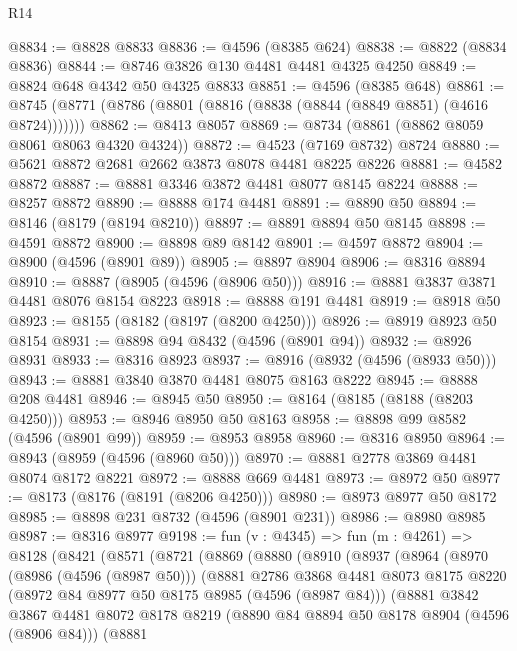 \begin{lexlean}{R14}
\begin{coremodule}
@8834 := @8828 @8833
@8836 := @4596 (@8385 @624)
@8838 := @8822 (@8834 @8836)
@8844 := @8746 @3826 @130 @4481 @4481 @4325 @4250
@8849 := @8824 @648 @4342 @50 @4325 @8833
@8851 := @4596 (@8385 @648)
@8861 := @8745 (@8771 (@8786 (@8801 (@8816 (@8838 (@8844 (@8849 @8851) (@4616 @8724)))))))
@8862 := @8413 @8057
@8869 := @8734 (@8861 (@8862 @8059 @8061 @8063 @4320 @4324))
@8872 := @4523 (@7169 @8732) @8724
@8880 := @5621 @8872 @2681 @2662 @3873 @8078 @4481 @8225 @8226
@8881 := @4582 @8872
@8887 := @8881 @3346 @3872 @4481 @8077 @8145 @8224
@8888 := @8257 @8872
@8890 := @8888 @174 @4481
@8891 := @8890 @50
@8894 := @8146 (@8179 (@8194 @8210))
@8897 := @8891 @8894 @50 @8145
@8898 := @4591 @8872
@8900 := @8898 @89 @8142
@8901 := @4597 @8872
@8904 := @8900 (@4596 (@8901 @89))
@8905 := @8897 @8904
@8906 := @8316 @8894
@8910 := @8887 (@8905 (@4596 (@8906 @50)))
@8916 := @8881 @3837 @3871 @4481 @8076 @8154 @8223
@8918 := @8888 @191 @4481
@8919 := @8918 @50
@8923 := @8155 (@8182 (@8197 (@8200 @4250)))
@8926 := @8919 @8923 @50 @8154
@8931 := @8898 @94 @8432 (@4596 (@8901 @94))
@8932 := @8926 @8931
@8933 := @8316 @8923
@8937 := @8916 (@8932 (@4596 (@8933 @50)))
@8943 := @8881 @3840 @3870 @4481 @8075 @8163 @8222
@8945 := @8888 @208 @4481
@8946 := @8945 @50
@8950 := @8164 (@8185 (@8188 (@8203 @4250)))
@8953 := @8946 @8950 @50 @8163
@8958 := @8898 @99 @8582 (@4596 (@8901 @99))
@8959 := @8953 @8958
@8960 := @8316 @8950
@8964 := @8943 (@8959 (@4596 (@8960 @50)))
@8970 := @8881 @2778 @3869 @4481 @8074 @8172 @8221
@8972 := @8888 @669 @4481
@8973 := @8972 @50
@8977 := @8173 (@8176 (@8191 (@8206 @4250)))
@8980 := @8973 @8977 @50 @8172
@8985 := @8898 @231 @8732 (@4596 (@8901 @231))
@8986 := @8980 @8985
@8987 := @8316 @8977
@9198 := fun (v : @4345) =>
  fun (m : @4261) =>
  @8128
    (@8421
      (@8571
        (@8721
          (@8869
            (@8880
              (@8910
                (@8937
                  (@8964
                    (@8970
                      (@8986 (@4596 (@8987 @50)))
                      (@8881
                        @2786
                        @3868
                        @4481
                        @8073
                        @8175
                        @8220
                        (@8972 @84 @8977 @50 @8175 @8985 (@4596 (@8987 @84)))
                        (@8881
                          @3842
                          @3867
                          @4481
                          @8072
                          @8178
                          @8219
                          (@8890 @84 @8894 @50 @8178 @8904 (@4596 (@8906 @84)))
                          (@8881

\end{coremodule}
\end{lexlean}
